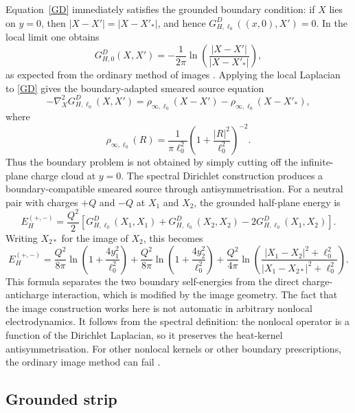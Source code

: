 \documentclass[nopacs,amsmath,amsfonts,amssymb,aps,superscriptaddress]{revtex4}
\begin{document}
Equation~\eqref{GD} immediately satisfies the grounded boundary condition: if \(X\) lies on \(y=0\), then \(|X-X'|=|X-X'_*|\), and hence \(G_{H,\ell_0}^D((x,0),X')=0\). In the local limit one obtains
\begin{equation}
  G_{H,0}^D(X,X')=-\frac{1}{2\pi}\ln\left(\frac{|X-X'|}{|X-X'_*|}\right),
\end{equation}
as expected from the ordinary method of images \cite{Jackson1999}. Applying the local Laplacian to \eqref{GD} gives the boundary-adapted smeared source equation
\begin{equation}
  -\nabla_X^2G_{H,\ell_0}^D(X,X')=\rho_{\infty,\ell_0}(X-X')-\rho_{\infty,\ell_0}(X-X'_*),
\end{equation}
where
\begin{equation}
  \rho_{\infty,\ell_0}(R)=\frac{1}{\pi\ell_0^2}\left(1+\frac{|R|^2}{\ell_0^2}\right)^{-2}.
\end{equation}
Thus the boundary problem is not obtained by simply cutting off the infinite-plane charge cloud at \(y=0\). The spectral Dirichlet construction produces a boundary-compatible smeared source through antisymmetrisation. For a neutral pair with charges \(+Q\) and \(-Q\) at \(X_1\) and \(X_2\), the grounded half-plane energy is
\begin{equation}
  E_H^{(+,-)}=\frac{Q^2}{2}\left[G_{H,\ell_0}^D(X_1,X_1)+G_{H,\ell_0}^D(X_2,X_2)-2G_{H,\ell_0}^D(X_1,X_2)\right].
\end{equation}
Writing \(X_{2*}\) for the image of \(X_2\), this becomes
\begin{equation}
  E_H^{(+,-)}=\frac{Q^2}{8\pi}\ln\left(1+\frac{4y_1^2}{\ell_0^2}\right)
  +\frac{Q^2}{8\pi}\ln\left(1+\frac{4y_2^2}{\ell_0^2}\right)
  +\frac{Q^2}{4\pi}\ln\left(\frac{|X_1-X_2|^2+\ell_0^2}{|X_1-X_{2*}|^2+\ell_0^2}\right).
\end{equation}
This formula separates the two boundary self-energies from the direct charge-anticharge interaction, which is modified by the image geometry. The fact that the image construction works here is not automatic in arbitrary nonlocal electrodynamics. It follows from the spectral definition: the nonlocal operator is a function of the Dirichlet Laplacian, so it preserves the heat-kernel antisymmetrisation. For other nonlocal kernels or other boundary prescriptions, the ordinary image method can fail \cite{BorgesBufalo2025}.

\subsection{Grounded strip}\label{subsec:strip}
\end{document}
